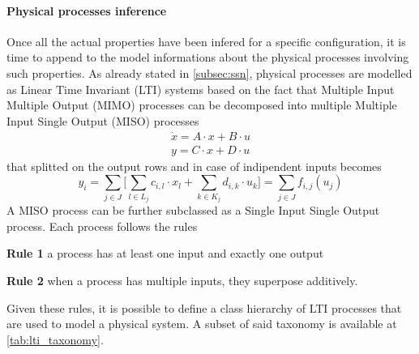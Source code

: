 \paragraph{Physical processes inference}
Once all the actual properties have been infered for a specific configuration, it is time to append to the model informations about the physical processes involving such properties. As already stated in \autoref{subsec:ssn}, physical processes are modelled as Linear Time Invariant (LTI) systems based on the fact that Multiple Input Multiple Output (MIMO) processes can be decomposed into multiple Multiple Input Single Output (MISO) processes
  \begin{gather*}
        \dot{x}=A\cdot x+B\cdot u \\
        y=C\cdot x+D\cdot u
  \end{gather*}
that splitted on the output rows and in case of indipendent inputs becomes
\begin{equation}
  y_i=\sum_{j \in J}\Bigg[\sum_{l\in L_j}c_{i,l}\cdot x_l+\sum_{k\in K_j}d_{i,k}\cdot u_k\Bigg]=\sum_{j \in J}f_{i,j}(u_j)
\end{equation}
A MISO process can be further subclassed as a Single Input Single Output process.
Each process follows the rules
\begin{description}[noitemsep]
  \item\textbf{Rule 1} a process has at least one input and exactly one output
  \item\textbf{Rule 2} when a process has multiple inputs, they superpose additively.
\end{description}
Given these rules, it is possible to define a class hierarchy of LTI processes that are used to model a physical system. A subset of said taxonomy is available at \autoref{tab:lti_taxonomy}.
